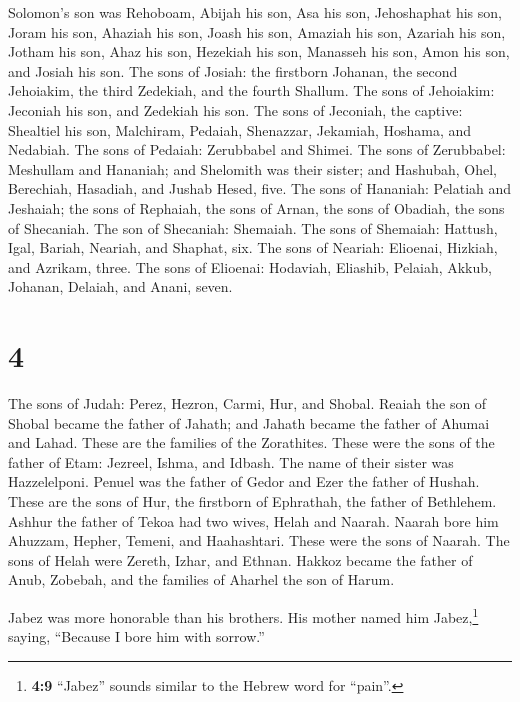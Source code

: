  Solomon's son was Rehoboam, Abijah his son, Asa his son,
Jehoshaphat his son,  Joram his son, Ahaziah his son,
Joash his son,  Amaziah his son, Azariah his son, Jotham
his son,  Ahaz his son, Hezekiah his son, Manasseh his
son,  Amon his son, and Josiah his son. 
The sons of Josiah: the firstborn Johanan, the second Jehoiakim, the
third Zedekiah, and the fourth Shallum.  The sons of
Jehoiakim: Jeconiah his son, and Zedekiah his son.  The
sons of Jeconiah, the captive: Shealtiel his son, 
Malchiram, Pedaiah, Shenazzar, Jekamiah, Hoshama, and Nedabiah.
 The sons of Pedaiah: Zerubbabel and Shimei. The sons of
Zerubbabel: Meshullam and Hananiah; and Shelomith was their sister;
 and Hashubah, Ohel, Berechiah, Hasadiah, and Jushab
Hesed, five.  The sons of Hananiah: Pelatiah and
Jeshaiah; the sons of Rephaiah, the sons of Arnan, the sons of Obadiah,
the sons of Shecaniah.  The son of Shecaniah: Shemaiah.
The sons of Shemaiah: Hattush, Igal, Bariah, Neariah, and Shaphat, six.
 The sons of Neariah: Elioenai, Hizkiah, and Azrikam,
three.  The sons of Elioenai: Hodaviah, Eliashib,
Pelaiah, Akkub, Johanan, Delaiah, and Anani, seven.

\hypertarget{section-3}{%
\section{4}\label{section-3}}

 The sons of Judah: Perez, Hezron, Carmi, Hur, and Shobal.
 Reaiah the son of Shobal became the father of Jahath; and
Jahath became the father of Ahumai and Lahad. These are the families of
the Zorathites.  These were the sons of the father of
Etam: Jezreel, Ishma, and Idbash. The name of their sister was
Hazzelelponi.  Penuel was the father of Gedor and Ezer the
father of Hushah. These are the sons of Hur, the firstborn of Ephrathah,
the father of Bethlehem.  Ashhur the father of Tekoa had
two wives, Helah and Naarah.  Naarah bore him Ahuzzam,
Hepher, Temeni, and Haahashtari. These were the sons of Naarah.
 The sons of Helah were Zereth, Izhar, and Ethnan.
 Hakkoz became the father of Anub, Zobebah, and the
families of Aharhel the son of Harum.

 Jabez was more honorable than his brothers. His mother
named him Jabez,\footnote{\textbf{4:9} ``Jabez'' sounds similar to the
  Hebrew word for ``pain''.} saying, ``Because I bore him with sorrow.''

